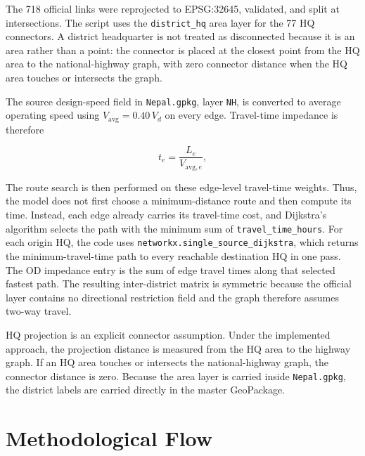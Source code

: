 \documentclass[11pt,a4paper]{article}
\begin{document}
The 718 official links were reprojected to EPSG:32645, validated, and split at
intersections. The script uses the \texttt{district\_hq} area layer
for the 77 HQ connectors. A district headquarter is not treated as disconnected
because it is an area rather than a point: the connector is placed at the
closest point from the HQ area to the national-highway graph, with zero
connector distance when the HQ area touches or intersects the graph.

The source design-speed field in \texttt{Nepal.gpkg}, layer \texttt{NH}, is
converted to average operating speed using
$V_{\text{avg}}=0.40\,V_d$ on every edge. Travel-time impedance is therefore

\begin{equation}
t_e=\frac{L_e}{V_{\text{avg},e}},
\end{equation}

The route search is then performed on these edge-level travel-time weights.
Thus, the model does not first choose a minimum-distance route and then compute
its time. Instead, each edge already carries its travel-time cost, and
Dijkstra's algorithm selects the path with the minimum sum of
\texttt{travel\_time\_hours}. For each origin HQ, the code uses
\texttt{networkx.single\_source\_dijkstra}, which returns the
minimum-travel-time path to every reachable destination HQ in one pass. The OD
impedance entry is the sum of edge travel times along that selected fastest
path. The resulting inter-district matrix is symmetric because the official
layer contains no directional restriction field and the graph therefore assumes
two-way travel.

HQ projection is an explicit connector assumption. Under the implemented approach,
the projection distance is measured from the HQ area to the highway graph. If an
HQ area touches or intersects the national-highway graph, the connector distance
is zero. Because the area layer is carried inside \texttt{Nepal.gpkg}, the
district labels are carried directly in the master GeoPackage.

\section{Methodological Flow}
\end{document}
